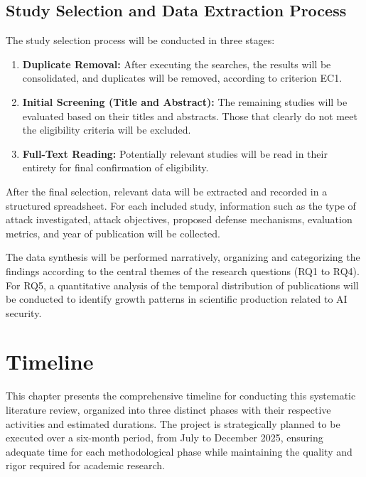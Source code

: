 \documentclass[twoside,brazilian,english]{UNISINOSmonografia}
\begin{document}
\section{Study Selection and Data Extraction Process}

The study selection process will be conducted in three stages:
\begin{enumerate}
    \item \textbf{Duplicate Removal:} After executing the searches, the results will be consolidated, and duplicates will be removed, according to criterion EC1.
    \item \textbf{Initial Screening (Title and Abstract):} The remaining studies will be evaluated based on their titles and abstracts. Those that clearly do not meet the eligibility criteria will be excluded.
    \item \textbf{Full-Text Reading:} Potentially relevant studies will be read in their entirety for final confirmation of eligibility.
\end{enumerate}

After the final selection, relevant data will be extracted and recorded in a structured spreadsheet. For each included study, information such as the type of attack investigated, attack objectives, proposed defense mechanisms, evaluation metrics, and year of publication will be collected.

The data synthesis will be performed narratively, organizing and categorizing the findings according to the central themes of the research questions (RQ1 to RQ4). For RQ5, a quantitative analysis of the temporal distribution of publications will be conducted to identify growth patterns in scientific production related to AI security.



\chapter{Timeline}

This chapter presents the comprehensive timeline for conducting this systematic literature review, organized into three distinct phases with their respective activities and estimated durations. The project is strategically planned to be executed over a six-month period, from July to December 2025, ensuring adequate time for each methodological phase while maintaining the quality and rigor required for academic research.
\end{document}
